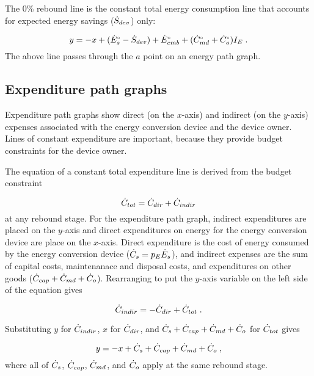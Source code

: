 The 0\% rebound line is the constant total energy consumption line 
that accounts for expected energy savings ($\dot{S}_{dev}$) only:

\begin{equation}
  y = -x + ({}{\dot{E}}^{\scriptscriptstyle \circ}_s - \dot{S}_{dev})
          + {}{\dot{E}}^{\scriptscriptstyle \circ}_{emb} + ({}{\dot{C}}^{\scriptscriptstyle \circ}_{md} + {}{\dot{C}}^{\scriptscriptstyle \circ}_o) I_E \; .
\end{equation}
%
The above line passes through the $a$ point on an energy path graph.


\subsection{Expenditure path graphs}
\label{sec:expenditure_path_graph_details}

Expenditure path graphs show direct (on the $x$-axis) and indirect (on the $y$-axis)
expenses associated with the energy conversion device 
and the device owner.
Lines of constant expenditure are important, 
because they provide budget constraints for the device owner.

The equation of a constant total expenditure line is derived from 
the budget constraint

\begin{equation}
  \dot{C}_{tot} = \dot{C}_{dir} + \dot{C}_{indir}
\end{equation}
%
at any rebound stage.
For the expenditure path graph,
indirect expenditures are placed on the $y$-axis
and direct expenditures on energy for the energy conversion device are place on the $x$-axis.
Direct expenditure is the cost of energy consumed by the energy conversion device
($\dot{C}_s = p_E \dot{E}_s$), and 
indirect expenses are the sum of capital costs, 
maintenanace and disposal costs, and 
expenditures on other goods
($\dot{C}_{cap} + \dot{C}_{md} + \dot{C}_o$).
Rearranging to put the $y$-axis variable on the left side of the equation gives

\begin{equation}
  \dot{C}_{indir} = - \dot{C}_{dir} + \dot{C}_{tot} \; .
\end{equation}

Substituting $y$ for $\dot{C}_{indir}$, 
$x$ for $\dot{C}_{dir}$, and 
$\dot{C}_s + \dot{C}_{cap} + \dot{C}_{md} + \dot{C}_o$ for $\dot{C}_{tot}$
gives

\begin{equation}
  y = -x + \dot{C}_s + \dot{C}_{cap} + \dot{C}_{md} + \dot{C}_o \; ,
\end{equation}
%
where all of $\dot{C}_s$, $\dot{C}_{cap}$, $\dot{C}_{md}$, and $\dot{C}_o$
apply at the same rebound stage.

